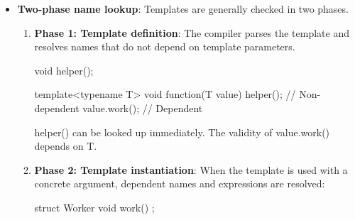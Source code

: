 \documentclass{report}
\begin{document}
\begin{itemize}
\begin{cppcode}
                template<typename T>
                struct Derived : Base<T> {
                    void run()
                    {
                        print();  // May fail
                    }
                };
            \end{cppcode}
            \bigbreak \noindent 
            Base<T> is a dependent base class. During the initial parsing of Derived, the compiler does not search dependent base classes for unqualified names.
            \bigbreak \noindent 
            You can qualify the call:
            \bigbreak \noindent 
            \begin{cppcode}
                template<typename T>
                struct Derived : Base<T> {
                    void run() {
                        this->print();
                    }
                };
            \end{cppcode}
            \bigbreak \noindent 
            Other valid approaches include:
            \bigbreak \noindent 
            \begin{cppcode}
            Base<T>::print();
            \end{cppcode}
            \bigbreak \noindent 
            or:
            \bigbreak \noindent 
            \begin{cppcode}
            using Base<T>::print;
            \end{cppcode}
            \bigbreak \noindent 
            The this-> expression is dependent because the type of this depends on T. Therefore, lookup for print can be delayed until instantiation.
        \item \textbf{Two-phase name lookup}: Templates are generally checked in two phases.
            \begin{enumerate}
                \item \textbf{Phase 1: Template definition}: The compiler parses the template and resolves names that do not depend on template parameters.
                    \bigbreak \noindent 
                    \begin{cppcode}
                        void helper();

                        template<typename T>
                        void function(T value)
                        {
                            helper();       // Non-dependent
                            value.work();   // Dependent
                        }
                    \end{cppcode}
                    \bigbreak \noindent 
                    helper() can be looked up immediately. The validity of value.work() depends on T.
                \item \textbf{Phase 2: Template instantiation}: When the template is used with a concrete argument, dependent names and expressions are resolved:
                    \bigbreak \noindent 
                    \begin{cppcode}
                        struct Worker {
                            void work() {}
                        };


\end{cppcode}
\end{enumerate}
\end{itemize}
\end{document}
